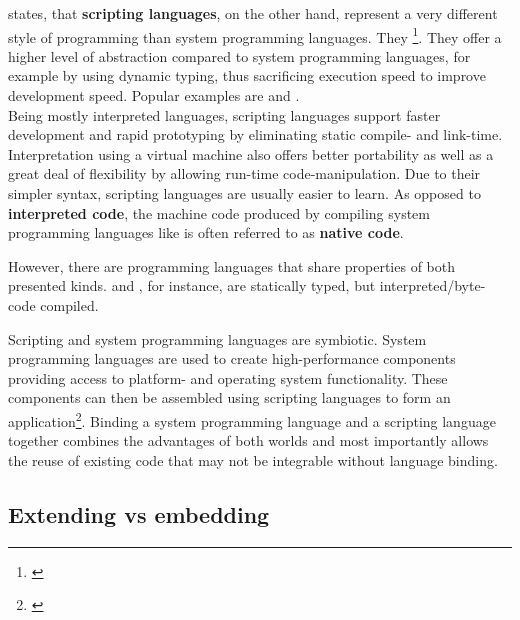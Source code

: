  states, that \textbf{scripting languages}, on the other hand, represent a very different style of programming than system programming languages. They \footnote{\citep{Ousterhout}}. They offer a higher level of abstraction compared to system programming languages, for example by using dynamic typing, thus sacrificing execution speed to improve development speed. Popular examples are  and .
\\ Being mostly interpreted languages, scripting languages support faster development and rapid prototyping by eliminating static compile- and link-time. Interpretation using a virtual machine also offers better portability as well as a great deal of flexibility by allowing run-time code-manipulation. Due to their simpler syntax, scripting languages are usually easier to learn. 
As opposed to \textbf{interpreted code}, the machine code produced by compiling system programming languages like  is often referred to as \textbf{native code}.

However, there are programming languages that share properties of both presented kinds.  and , for instance, are statically typed, but interpreted/byte-code compiled.

Scripting and system programming languages are symbiotic. System programming languages are used to create high-performance components providing access to platform- and operating system functionality. These components can then be assembled using scripting languages to form an application\footnote{\citep{Ousterhout}}. Binding a system programming language and a scripting language together combines the advantages of both worlds and most importantly allows the reuse of existing code that may not be integrable without language binding.

\subsection{Extending vs embedding}

